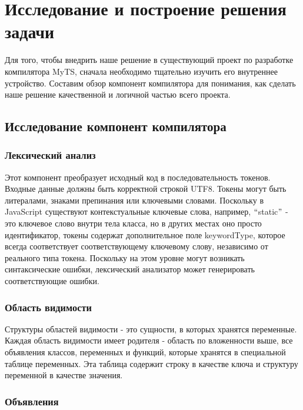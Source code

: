 \section{Исследование и построение решения задачи}
\label{sec:Chapter3} 

Для того, чтобы внедрить наше решение в существующий проект по разработке компилятора MyTS,
сначала необходимо тщательно изучить его внутреннее устройство.
Составим обзор компонент компилятора для понимания, как сделать наше решение качественной и логичной частью всего проекта.

\subsection{Исследование компонент компилятора}

\subsubsection{Лексический анализ}

Этот компонент преобразует исходный код в последовательность токенов.
Входные данные должны быть корректной строкой UTF8.
Токены могут быть литералами, знаками препинания или ключевыми словами.
Поскольку в JavaScript существуют контекстуальные ключевые слова, например, \(``\)static\("\) - это ключевое слово внутри тела
класса, но в других местах оно просто идентификатор, токены содержат дополнительное поле keywordType,
которое всегда соответствует соответствующему ключевому слову, независимо от реального типа токена.
Поскольку на этом уровне могут возникать синтаксические ошибки, лексический анализатор может
генерировать соответствующие ошибки.

\subsubsection{Область видимости}

Структуры областей видимости - это сущности, в которых хранятся переменные.
Каждая область видимости имеет родителя - область по вложенности выше, все объявления классов, переменных и функций,
которые хранятся в специальной таблице переменных.
Эта таблица содержит строку в качестве ключа и структуру переменной в качестве значения.

\subsubsection{Объявления}

